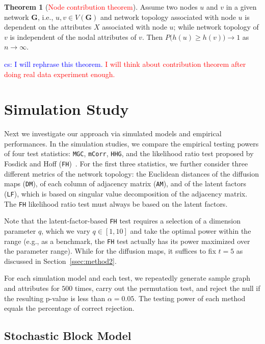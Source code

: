\documentclass[11pt]{article}
\theoremstyle{definition}
\newtheorem{theorem}{Theorem}[section]
\newcommand{\cs}[1]{\textcolor{blue}{cs: #1}}
\begin{document}
\begin{theorem}[\textcolor{red}{Node contribution theorem}]
	\label{contributiontheorem}
	Assume two nodes $u$ and $v$ in a given network $\mathbf{G}$, i.e., $u, v \in V(\mathbf{G})$ and network topology associated with node $u$  is dependent on the attributes $X$ associated with node $u$; while network topology of $v$ is independent of the nodal attributes of $v$. Then $P\big(  h(u)  \geq h(v) \big) \longrightarrow 1$ as $n \rightarrow \infty$.
\end{theorem}	
\cs{I will rephrase this theorem.}
\textcolor{red}{I will think about contribution theorem after doing real data experiment enough.}


\section{Simulation Study}
\label{sec:simulation}
	\vspace*{-0.2cm}
Next we investigate our approach via simulated models and empirical performances. In the simulation studies, we compare the empirical testing powers of four test statistics: \texttt{MGC}, \texttt{mCorr}, \texttt{HHG}, and the likelihood ratio test proposed by Fosdick and Hoff (\texttt{FH})~\cite{fosdick2015testing}. For the first three statistics, we further consider three different metrics of the network topology: the Euclidean distances of the diffusion maps (\texttt{DM}), of each column of adjacency matrix (\texttt{AM}), and of the latent factors (\texttt{LF}), which is based on singular value decomposition of the adjacency matrix. The \texttt{FH} likelihood ratio test must always be based on the latent factors.

Note that the latent-factor-based \texttt{FH} test requires a selection of a dimension parameter $q$, which we vary $q \in [1,10]$ and take the optimal power within the range (e.g., as a benchmark, the \texttt{FH} test actually has its power maximized over the parameter range). While for the diffusion maps, it suffices to fix $t=5$ as discussed in Section~\ref{ssec:method2}.

For each simulation model and each test, we repeatedly generate sample graph and attributes for $500$ times, carry out the permutation test, and reject the null if the resulting p-value is less than $\alpha = 0.05$. The testing power of each method equals the percentage of correct rejection. 

\subsection{Stochastic Block Model}
\end{document}
